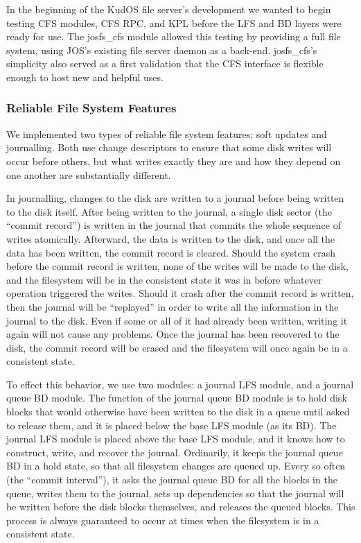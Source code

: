 In the beginning of the KudOS file server's development we wanted to begin
testing CFS modules, CFS RPC, and KPL before the LFS and BD layers were ready
for use. The josfs\_cfs module allowed this testing by providing a full file
system, using JOS's existing file server daemon as a back-end. josfs\_cfs's
simplicity also served as a first validation that the CFS interface is flexible
enough to host new and helpful uses.

\subsubsection{Reliable File System Features}
\label{sec:solution:impl:reliable}

We implemented two types of reliable file system features: soft updates and
journalling. Both use change descriptors to ensure that some disk writes will
occur before others, but what writes exactly they are and how they depend on one
another are substantially different.

In journalling, changes to the disk are written to a journal before being
written to the disk itself. After being written to the journal, a single disk
sector (the ``commit record'') is written in the journal that commits the whole
sequence of writes atomically. Afterward, the data is written to the disk, and
once all the data has been written, the commit record is cleared. Should the
system crash before the commit record is written, none of the writes will be
made to the disk, and the filesystem will be in the consistent state it was in
before whatever operation triggered the writes. Should it crash after the commit
record is written, then the journal will be ``replayed'' in order to write all
the information in the journal to the disk. Even if some or all of it had
already been written, writing it again will not cause any problems. Once the
journal has been recovered to the disk, the commit record will be erased and the
filesystem will once again be in a consistent state.

To effect this behavior, we use two modules: a journal LFS module, and a journal
queue BD module. The function of the journal queue BD module is to hold disk
blocks that would otherwise have been written to the disk in a queue until asked
to release them, and it is placed below the base LFS module (as its BD). The
journal LFS module is placed above the base LFS module, and it knows how to
construct, write, and recover the journal. Ordinarily, it keeps the journal
queue BD in a hold state, so that all filesystem changes are queued up. Every so
often (the ``commit interval''), it asks the journal queue BD for all the blocks
in the queue, writes them to the journal, sets up dependencies so that the
journal will be written before the disk blocks themselves, and releases the
queued blocks. This process is always guaranteed to occur at times when the
filesystem is in a consistent state.

